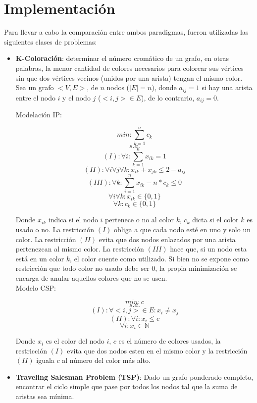 \documentclass[12pt]{report}
\begin{document}
\chapter{Implementación}

Para llevar a cabo la comparación entre ambos paradigmas, fueron utilizadas las siguientes clases de problemas:
\begin{itemize}
\item \textbf{K-Coloración}: determinar el número cromático de un grafo, en otras palabras, la menor cantidad de colores necesarios para colorear sus vértices sin que dos vértices vecinos (unidos por una arista) tengan el mismo color.\\

Sea un grafo $<V,E>$, de $n$ nodos ($|E|=n$), donde $a_{ij}=1$ si hay una arista entre el nodo $i$ y el nodo $j$ ($<i,j>\in E$), de lo contrario, $a_{ij}=0$.

Modelación IP:

$$min: \sum_{k=1}^nc_k$$
$$s.a.$$
$$(I): \forall i: \sum_{k=1}^nx_{ik}=1$$
$$(II): \forall i\forall j \forall k: x_{ik}+x_{jk} \leq 2-a_{ij}$$
$$(III): \forall k: \sum_{i=1}^nx_{ik} -n*c_k\leq 0$$
$$\forall i\forall k: x_{ik}\in\{0,1\}$$
$$\forall k: c_{k}\in\{0,1\}$$

Donde $x_{ik}$ indica si el nodo $i$ pertenece o no al color $k$, $c_k$ dicta si el color $k$ es usado o no. La restricción $(I)$ obliga a que cada nodo esté en uno y solo un color. La restricción $(II)$ evita que dos nodos enlazados por una arista pertenezcan al mismo color. La restricción $(III)$ hace que, si un nodo esta está en un color $k$, el color cuente como utilizado. Si bien no se expone como restricción que todo color no usado debe ser 0, la propia minimización se encarga de anular aquellos colores que no se usen.\\

Modelo CSP:

$$min: c$$
$$s.a.$$
$$(I):\forall <i,j> \in E: x_i\neq x_j$$
$$(II):\forall i: x_i\leq c$$
$$\forall i: x_i\in \mathbb{N}$$

Donde $x_i$ es el color del nodo $i$, $c$ es el número de colores usados, la restricción $(I)$ evita que dos nodos esten en el mismo color y la restricción $(II)$ iguala $c$ al número del color más alto.


\item \textbf{Traveling Salesman Problem (TSP)}: Dado un grafo ponderado completo, encontrar el ciclo simple que pase por todos los nodos tal que la suma de aristas sea mínima.


\end{itemize}
\end{document}
